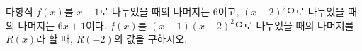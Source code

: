 다항식 $f(x)$를 $x-1$로 나누었을 때의 나머지는 $6$이고, $(x-2)^2$으로 나누었을 때의 나머지는 $6x+1$이다. $f(x)$를 $(x-1)(x-2)^2$으로 나누었을 때의 나머지를 $R(x)$라 할 때, $R(-2)$의 값을 구하시오.
